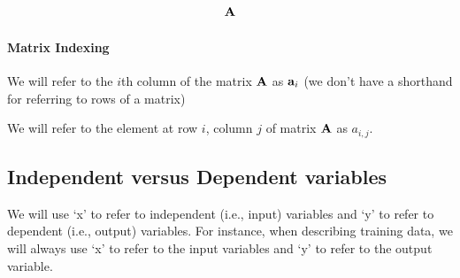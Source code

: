 \documentclass{tufte-handout}
\begin{document}
\begin{align}
\mathbf{A}
\end{align}

\paragraph{Matrix Indexing}
\be
\item We will refer to the $i$th column of the matrix $\mathbf{A}$ as $\mathbf{a}_i$ (we don't have a shorthand for referring to rows of a matrix)
\item We will refer to the element at row $i$, column $j$ of matrix $\mathbf{A}$ as $a_{i, j}$.
\ee



\subsection{Independent versus Dependent variables}
We will use `x' to refer to independent (i.e., input) variables and `y' to refer to dependent (i.e., output) variables.  For instance, when describing training data, we will always use `x' to refer to the input variables and `y' to refer to the output variable.
\end{document}
